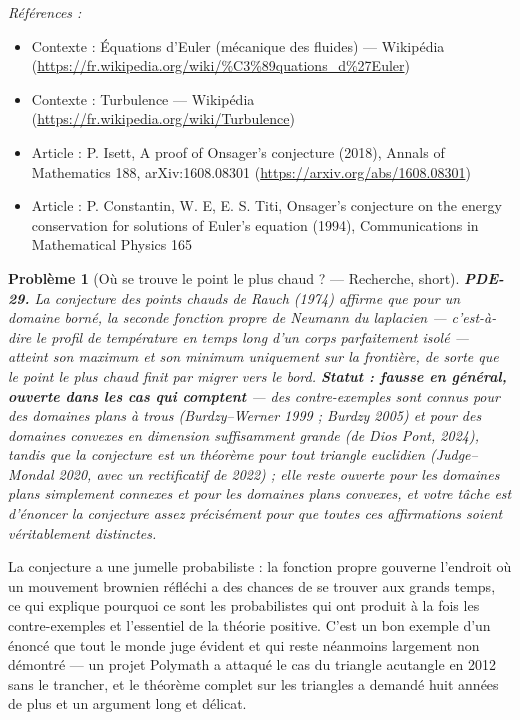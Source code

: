 \documentclass[11pt]{article}
\newtheorem{problem}{Problème}
\newenvironment{refs}{\par\small\noindent\emph{Références :}\begin{itemize}\setlength\itemsep{0pt}}{\end{itemize}\normalsize}
\begin{document}
\begin{refs}
\item Contexte : Équations d'Euler (mécanique des fluides) --- Wikipédia (\url{https://fr.wikipedia.org/wiki/%C3%89quations_d%27Euler})
\item Contexte : Turbulence --- Wikipédia (\url{https://fr.wikipedia.org/wiki/Turbulence})
\item Article : P. Isett, \og{} A proof of Onsager's conjecture \fg{} (2018), Annals of Mathematics 188, arXiv:1608.08301 (\url{https://arxiv.org/abs/1608.08301})
\item Article : P. Constantin, W. E, E. S. Titi, \og{} Onsager's conjecture on the energy conservation for solutions of Euler's equation \fg{} (1994), Communications in Mathematical Physics 165
\end{refs}

\bigskip

\begin{problem}[{Où se trouve le point le plus chaud ? --- Recherche, short}]
\textbf{PDE-29.} La conjecture des points chauds de Rauch (1974) affirme
que pour un domaine borné, la seconde fonction propre de Neumann du laplacien --- c'est-à-dire
le profil de température en temps long d'un corps parfaitement isolé --- atteint son
maximum et son minimum uniquement sur la frontière, de sorte que le point le plus chaud finit par
migrer vers le bord. \textbf{Statut : fausse en général, ouverte dans les cas qui comptent} ---
des contre-exemples sont connus pour des domaines plans à trous (Burdzy--Werner 1999 ;
Burdzy 2005) et pour des domaines convexes en dimension suffisamment grande
(de Dios Pont, 2024), tandis que la conjecture est un théorème pour tout triangle
euclidien (Judge--Mondal 2020, avec un rectificatif de 2022) ; elle reste ouverte pour les domaines
plans simplement connexes et pour les domaines plans convexes, et votre tâche est d'énoncer
la conjecture assez précisément pour que toutes ces affirmations soient véritablement
distinctes.
\end{problem}

\noindent La conjecture a une jumelle probabiliste : la fonction propre gouverne
l'endroit où un mouvement brownien réfléchi a des chances de se trouver aux grands temps,
ce qui explique pourquoi ce sont les probabilistes qui ont produit à la fois les contre-exemples et
l'essentiel de la théorie positive. C'est un bon exemple d'un énoncé que tout le monde juge évident
et qui reste néanmoins largement non démontré --- un projet Polymath a attaqué le cas du triangle
acutangle en 2012 sans le trancher, et le théorème complet sur les triangles a demandé huit années
de plus et un argument long et délicat.
\end{document}

